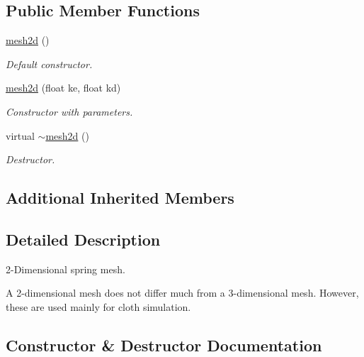 \subsection*{Public Member Functions}
\begin{DoxyCompactItemize}
\item 
\mbox{\label{classphysim_1_1meshes_1_1mesh2d_ae736ed194bb1c00bdd5fa1157ce0cc21}} 
\hyperlink{classphysim_1_1meshes_1_1mesh2d_ae736ed194bb1c00bdd5fa1157ce0cc21}{mesh2d} ()
\begin{DoxyCompactList}\small\item\em Default constructor. \end{DoxyCompactList}\item 
\hyperlink{classphysim_1_1meshes_1_1mesh2d_a4d5e184186bbe4e6e67cf6dd5d2bca5e}{mesh2d} (float ke, float kd)
\begin{DoxyCompactList}\small\item\em Constructor with parameters. \end{DoxyCompactList}\item 
\mbox{\label{classphysim_1_1meshes_1_1mesh2d_a6b5ca67d5bd3796086d2d2893c1dbf4e}} 
virtual \hyperlink{classphysim_1_1meshes_1_1mesh2d_a6b5ca67d5bd3796086d2d2893c1dbf4e}{$\sim$mesh2d} ()
\begin{DoxyCompactList}\small\item\em Destructor. \end{DoxyCompactList}\end{DoxyCompactItemize}
\subsection*{Additional Inherited Members}


\subsection{Detailed Description}
2-\/\+Dimensional spring mesh. 

A 2-\/dimensional mesh does not differ much from a 3-\/dimensional mesh. However, these are used mainly for cloth simulation. 

\subsection{Constructor \& Destructor Documentation}
\mbox{\label{classphysim_1_1meshes_1_1mesh2d_a4d5e184186bbe4e6e67cf6dd5d2bca5e}} 

